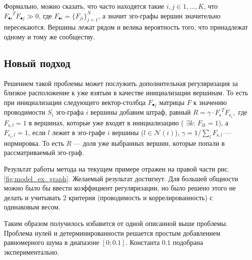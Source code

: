 \documentclass{ITaSconf}
\begin{document}
Формально, можно сказать, что часто находятся такие $i,j \in {1,\dots, K}$, что ${F_{\bullet i}}^T F_{\bullet j} \gg 0$, где $F_{\bullet i} = \{F_{j i}\}_{j=1}^N$, а значит эго-графы вершин значительно пересекаются. 
Вершины лежат рядом и велика вероятность того, что принадлежат одному и тому же сообществу.

\subsection{Новый подход}

Решением такой проблемы может послужить дополнительная регуляризация за близкое расположение к уже взятым в качестве инициализации вершинам. 
То есть при инициализации следующего вектор-столбца $F_{\bullet j}$ матрицы $F$ к значению проводимости $S_i$ эго-графа $i$ вершины добавим штраф, равный 
$R = \gamma \cdot {F_{\mathrm{s}}}^T  F_{\mathrm{e}_i},$
где $F_{\mathrm{s}, l} = 1$ в вершинах, которые уже входят в инициализацию ( $\exists k:\, F_{lk}=1 $),
а $F_{\mathrm{e}_i, l} = 1$, если $l$ лежит в эго-графе $i$ вершины ($l \in \mathcal{N}(i)$),
$\gamma = 1 / \sum_l F_{\mathrm{s}, l}$ --- нормировка. 
То есть $R$ --- доля уже выбранных вершин, которые попали в рассматриваемый эго-граф.  

Результат работы метода на текущем примере отражен на правой части рис. \ref{fig:model_ex_graph}. Желаемый результат достигнут. Для большей общности можно было бы ввести коэффициент регуляризации, но было решено этого не делать и учитывать 2 критерия (проводимость и коррелированность) с одинаковым весом. 

Таким образом получилось избавится от одной описанной выше проблемы. 
Проблема нулей и детерминированности решается простым добавлением равномерного шума в диапазоне $[0; 0.1]$. Константа $0.1$ подобрана экспериментально. 
\end{document}

